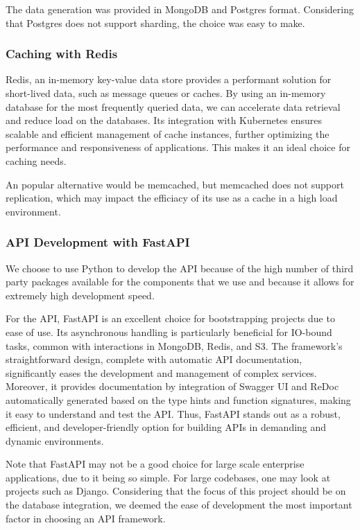 \documentclass{report}
\begin{document}
    The data generation was provided in MongoDB and Postgres format. Considering that Postgres does not support sharding, the choice was easy to make.

    \subsubsection{Caching with Redis}
    Redis, an in-memory key-value data store provides a performant solution for short-lived data, such as message queues or caches. By using an in-memory database for the most frequently queried data, we can accelerate data retrieval and reduce load on the databases. Its integration with Kubernetes ensures scalable and efficient management of cache instances, further optimizing the performance and responsiveness of applications. This makes it an ideal choice for caching needs.

    An popular alternative would be memcached, but memcached does not support replication, which may impact the efficiacy of its use as a cache in a high load environment.

    \subsubsection{API Development with FastAPI}
    We choose to use Python to develop the API because of the high number of third party packages available for the components that we use and because it allows for extremely high development speed.

    For the API, FastAPI is an excellent choice for bootstrapping projects due to ease of use. Its asynchronous handling is particularly beneficial for IO-bound tasks, common with interactions in MongoDB, Redis, and S3. The framework's straightforward design, complete with automatic API documentation, significantly eases the development and management of complex services. Moreover, it provides documentation by integration of Swagger UI and ReDoc automatically generated based on the type hints and function signatures, making it easy to understand and test the API. Thus, FastAPI stands out as a robust, efficient, and developer-friendly option for building APIs in demanding and dynamic environments.

    Note that FastAPI may not be a good choice for large scale enterprise applications, due to it being so simple. For large codebases, one may look at projects such as Django. Considering that the focus of this project should be on the database integration, we deemed the ease of development the most important factor in choosing an API framework.
\end{document}
